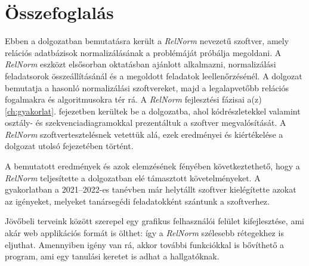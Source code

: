 \chapter{Összefoglalás}

Ebben a dolgozatban bemutatásra került a \textit{RelNorm} nevezetű szoftver, amely relációs adatbázisok normalizálásának a problémáját próbálja megoldani. A \textit{RelNorm} eszközt elsősorban oktatásban ajánlott alkalmazni, normalizálási feladatsorok összeállításánál és a megoldott feladatok leellenőrzésénél. A dolgozat bemutatja a hasonló normalizálási szoftvereket, majd a legalapvetőbb relációs fogalmakra és algoritmusokra tér rá. A \textit{RelNorm} fejlesztési fázisai a(z) \ref{ch:gyakorlat}. fejezetben kerültek be a dolgozatba, ahol kódrészletekkel valamint osztály- és szekvenciadiagramokkal prezentáltuk a szoftver megvalósítását. A \textit{RelNorm} szoftvertesztelésnek vetettük alá, ezek eredményei és kiértékelése a dolgozat utolsó fejezetében történt.

A bemutatott eredmények és azok elemzésének fényében következtethető, hogy a \textit{RelNorm} teljesítette a dolgozatban elé támasztott követelményeket. A gyakorlatban a 2021--2022-es tanévben már helytállt szoftver kielégítette azokat az igényeket, melyeket tanársegédi feladatokként szántunk a szoftverhez.

Jövőbeli terveink között szerepel egy grafikus felhasználói felület kifejlesztése, ami akár web applikációs formát is ölthet: így a \textit{RelNorm} szélesebb rétegekhez is eljuthat. Amennyiben igény van rá, akkor további funkciókkal is bővíthető a program, ami egy tanulási keretet is adhat a hallgatóknak.